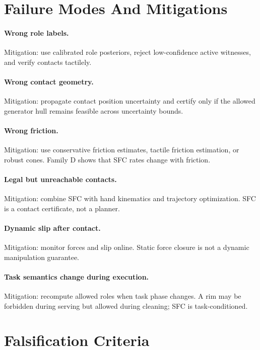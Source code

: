 \documentclass{article}
\begin{document}
\section{Failure Modes And Mitigations}

\paragraph{Wrong role labels.}
Mitigation: use calibrated role posteriors, reject low-confidence active witnesses, and verify contacts tactilely.

\paragraph{Wrong contact geometry.}
Mitigation: propagate contact position uncertainty and certify only if the allowed generator hull remains feasible across uncertainty bounds.

\paragraph{Wrong friction.}
Mitigation: use conservative friction estimates, tactile friction estimation, or robust cones. Family D shows that SFC rates change with friction.

\paragraph{Legal but unreachable contacts.}
Mitigation: combine SFC with hand kinematics and trajectory optimization. SFC is a contact certificate, not a planner.

\paragraph{Dynamic slip after contact.}
Mitigation: monitor forces and slip online. Static force closure is not a dynamic manipulation guarantee.

\paragraph{Task semantics change during execution.}
Mitigation: recompute allowed roles when task phase changes. A rim may be forbidden during serving but allowed during cleaning; SFC is task-conditioned.

\section{Falsification Criteria}
\end{document}
